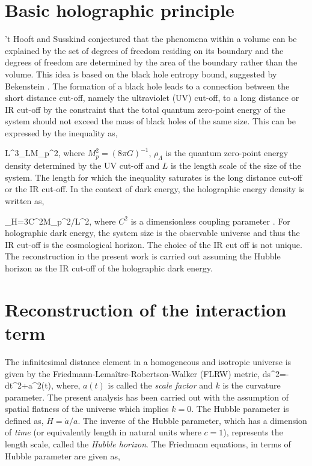\documentclass[11pt]{article}
\begin{document}
\section{Basic holographic principle}
\label{basicholo}

't Hooft\cite{tHoo} and Susskind\cite{susholo} conjectured that the phenomena within a volume can be explained by the set of degrees of freedom residing on its boundary and the degrees of freedom are determined by the area of the boundary rather than the volume. This idea is based on the black hole entropy bound, suggested by Bekenstein \cite{beke}. The formation of a black hole leads to a connection between the short distance cut-off, namely the ultraviolet (UV) cut-off, to a long distance or IR cut-off\cite{cohen} by the constraint that the total quantum zero-point energy of the system should not exceed the mass of black holes of the same size. This can be expressed by the inequality as, 

\be 
L^3\rho_{\Lambda}\leq LM_p^2,
\ee 
where $M_p^2=(8\pi G)^{-1}$, $\rho_{\Lambda}$ is the quantum zero-point energy density determined by the UV cut-off and $L$ is the length scale of the size of the system. The length for which the inequality saturates is the long distance cut-off or the IR cut-off. In the context of dark energy, the holographic energy density is written as,

\be 
\rho_{H}=3C^2M_p^2/L^2,
\ee
where $C^2$ is a dimensionless coupling parameter \cite{liholo}.
For holographic dark energy, the system size is the observable universe and thus the IR cut-off is the cosmological horizon. The choice of the IR cut off is not unique. The reconstruction in the present work is carried out assuming the Hubble horizon as the IR cut-off of the holographic dark energy. 


\section{Reconstruction of the interaction term}
\label{reconst}

The infinitesimal distance element in a homogeneous and isotropic universe is given by the Friedmann-Lema\^{i}tre-Robertson-Walker (FLRW) metric,
\be
ds^2=-dt^2+a^2(t),
\ee 
where, $a(t)$ is called the {\it scale factor} and $k$ is the curvature parameter. The present analysis has been carried out with the assumption of spatial flatness of the universe which implies $k=0$. The Hubble parameter is defined as, $H=\dot{a}/a$. The inverse of the Hubble parameter, which has a dimension of {\it time} (or equivalently length in natural units where $c=1$), represents the length scale, called the {\it Hubble horizon}. The Friedmann equations, in terms of Hubble parameter are given as,
\end{document}
